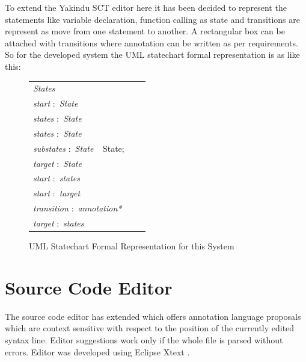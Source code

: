To extend the Yakindu SCT editor here it has been decided to represent the statements like variable declaration, function calling as state and transitions are represent as move from one statement to another. A rectangular box can be attached with transitions where annotation can be written as per requirements. So for the developed system the UML statechart formal representation is as like this: 
\begin{figure}[ht!]
	\centering
	\begin{tabular}{lll}
	\footnotesize                       
	\textit{States}          \\
	\footnotesize                       
	\textit{start}          
	$:$  \textit{State}\\
	
	\textit{states}          
	$:$  \textit{State}\\
	
	\textit{states}           
	$:$  \textit{State}\\
	\footnotesize
	\textit{substates}            $:$         \textit{State} $\ \  $ {State};       \\   
	\footnotesize
	\textit{target}             $:$         \textit{State}    \\
	\footnotesize                       
	\textit{start}           
	$:$  \textit{states}\\
	\footnotesize                       
	\textit{start}          
	$:$ \textit{target}\\
	\footnotesize                       
	\textit{transition}          
	$:$ \textit{annotation*}\\
	\footnotesize                       
	\textit{target} $:$ \textit{states}        \\ 	
	\end{tabular}
	\caption{UML Statechart Formal Representation for this System}
	\label{statechart_formal_representation_for _this_system}
	\end{figure}
\section{Source Code Editor}
The source code editor has extended which offers annotation language proposals which are context sensitive with respect to the position of the currently edited syntax line. Editor suggestions work only if the whole file is parsed without errors. Editor was developed using Eclipse Xtext \cite{ref_17_xtext:grammar}.

